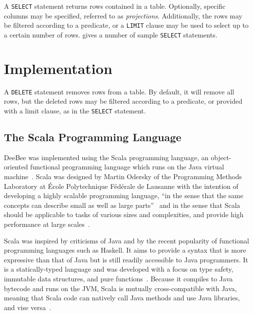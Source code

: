 A \texttt{SELECT} statement returns rows contained in a table. Optionally, specific columns may be specified, referred to as \textit{projections}. Additionally, the rows may be filtered according to a predicate, or a \texttt{LIMIT} clause may be used to select up to a certain number of rows.  gives a number of sample \texttt{SELECT} statements.

\begin{listing}[h!]
    \begin{verbatim}
        SELECT * FROM Writers;
        SELECT first_name, last_name FROM Writers;
        SELECT * FROM Writers WHERE first_name = "Anton";
        SELECT * FROM Writers WHERE id > 5 AND country_of_origin = "USA";
        SELECT * FROM Writers LIMIT 5;
    \end{verbatim}
    \caption{Sample SQL \texttt[SELECT} statements.}
    \label{lst:select}.
\end{listing}
\section{Implementation}

A \texttt{DELETE} statement removes rows from a table. By default, it will remove all rows, but the deleted rows may be filtered according to a predicate, or provided with a limit clause, as in the \texttt{SELECT} statement.

\subsection{The Scala Programming Language}

DeeBee was implemented using the Scala programming language, an object-oriented functional programming language which runs on the Java virtual machine~\cite{odersky2004scala,odersky2004overview,odersky2008programming}. Scala was designed by Martin Odersky of the Programming Methods Laboratory at \'Ecole Polytechnique F\'ed\'erale de Lausanne with the intention of developing a highly scalable programming language, ``in the sense that the same concepts can describe small as well as large parts''~\cite{odersky2004scala} and in the sense that Scala should be applicable to tasks of various sizes and complexities, and provide high performance at large scales~\cite{odersky2008programming}. 

Scala was inspired by criticisms of Java and by the recent popularity of functional programming languages such as Haskell. It aims to provide a syntax that is more expressive than that of Java but is still readily accessible to Java programmers. It is a statically-typed language and was developed with a focus on type safety, immutable data structures, and pure functions~\cite{odersky2004scala,odersky2004overview,odersky2008programming}. Because it compiles to Java bytecode and runs on the JVM, Scala is mutually cross-compatible with Java, meaning that Scala code can natively call Java methods and use Java libraries, and vise versa~\cite{odersky2008programming}.

